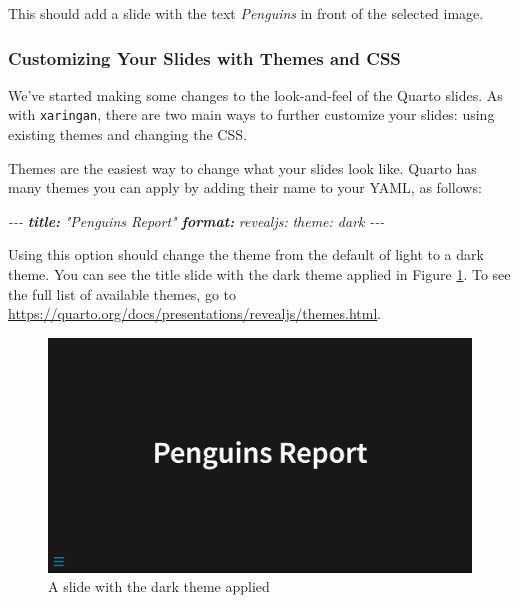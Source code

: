 \documentclass[
]{book}
\newenvironment{Shaded}{\begin{snugshade}}{\end{snugshade}}
\newcommand{\AnnotationTok}[1]{\textcolor[rgb]{0.56,0.35,0.01}{\textbf{\textit{#1}}}}
\newcommand{\CommentTok}[1]{\textcolor[rgb]{0.56,0.35,0.01}{\textit{#1}}}
\begin{document}
This should add a slide with the text \emph{Penguins} in front of the selected image.

\hypertarget{customizing-your-slides-with-themes-and-css}{%
\subsubsection*{Customizing Your Slides with Themes and CSS}\label{customizing-your-slides-with-themes-and-css}}

We've started making some changes to the look-and-feel of the Quarto slides. As with \texttt{xaringan}, there are two main ways to further customize your slides: using existing themes and changing the CSS.

Themes are the easiest way to change what your slides look like. Quarto has many themes you can apply by adding their name to your YAML, as follows:

\begin{Shaded}
\begin{Highlighting}[]
\CommentTok{{-}{-}{-}}
\AnnotationTok{title:}\CommentTok{ "Penguins Report"}
\AnnotationTok{format:}
\CommentTok{  revealjs: }
\CommentTok{    theme: dark}
\CommentTok{{-}{-}{-}}
\end{Highlighting}
\end{Shaded}

Using this option should change the theme from the default of light to a dark theme. You can see the title slide with the dark theme applied in Figure \ref{fig:quarto-slide-dark}. To see the full list of available themes, go to \url{https://quarto.org/docs/presentations/revealjs/themes.html}.

\begin{figure}
\includegraphics[width=1\linewidth]{assets/quarto-slide-dark} \caption{A slide with the dark theme applied}\label{fig:quarto-slide-dark}
\end{figure}
\end{document}
